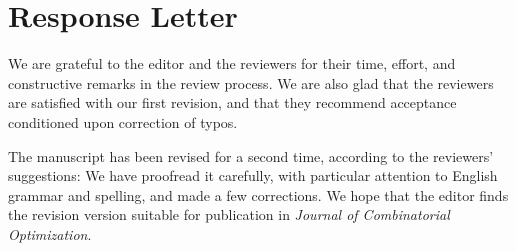 \documentclass[12pt]{article}
\begin{document}
\section*{Response Letter}
We are grateful to the editor and the reviewers for their time, effort, and constructive remarks in the review process.
We are also glad that the reviewers are satisfied with our first revision, and that they recommend acceptance conditioned upon correction of typos.

The manuscript has been revised for a second time, according to the reviewers' suggestions:
We have proofread it carefully, with particular attention to English grammar and spelling, and made a few corrections.
We hope that the editor finds the revision version suitable for publication in \emph{Journal of Combinatorial Optimization}.
\end{document}
